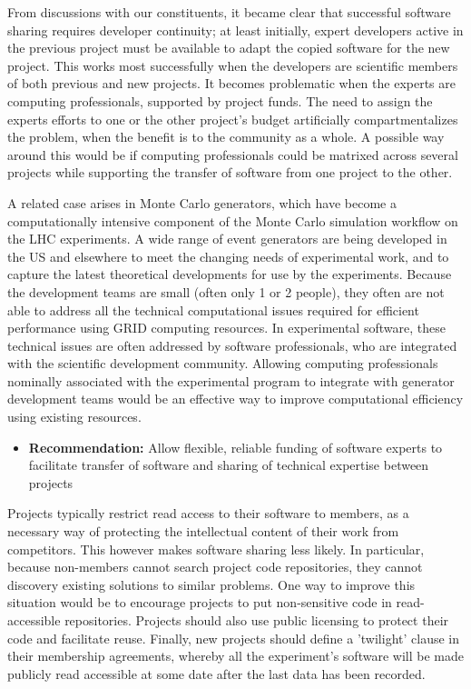 From discussions with our constituents, it became clear that successful
software sharing requires developer continuity; at least
initially, expert developers active in the previous project must be available
to adapt the copied software for the new project.
This works most successfully when the developers are scientific members
of both previous and new projects.  It becomes problematic
when the experts are computing professionals, supported by project funds.
The need to assign the experts efforts to one or
the other project's budget artificially compartmentalizes the problem,
when the benefit is to the community as a whole.
A possible way around this would be if computing professionals could be
matrixed across several projects while supporting the
transfer of software from one project to the other.

A related case arises in Monte Carlo generators, which
have become a computationally intensive component of the Monte
Carlo simulation workflow on the LHC experiments.  A wide range of event
generators are being developed in the US and elsewhere to meet the
changing needs of experimental work, and to capture the latest
theoretical developments for use by the experiments.   Because the
development teams are small (often only 1 or 2 people), they
often are not able to address all the technical computational
issues required for efficient performance using GRID
computing resources.  In experimental software, these technical issues
are often addressed  by software professionals, who are integrated with the
scientific development community.
Allowing computing professionals nominally associated with the experimental program
to integrate with generator development teams would be an effective
way to improve computational efficiency using existing resources.

\begin{itemize}
\item[] {\bf Recommendation:} 
 Allow flexible, reliable funding of software experts to facilitate transfer of software and sharing of technical expertise between projects
\end{itemize}

Projects typically restrict read access to their software to members, as a necessary
way of protecting the intellectual content of their work from competitors.
This however makes software sharing less likely.  In particular,
because non-members cannot search project code repositories,
they cannot discovery existing solutions to similar problems.
One way to improve this situation would be to encourage projects to put
non-sensitive code in read-accessible repositories.  Projects should also
use public licensing to protect their code and facilitate reuse.  Finally,
new projects should define a 'twilight' clause in their membership agreements,
whereby all the experiment's software will be made publicly read accessible
at some date after the last data has been recorded.

